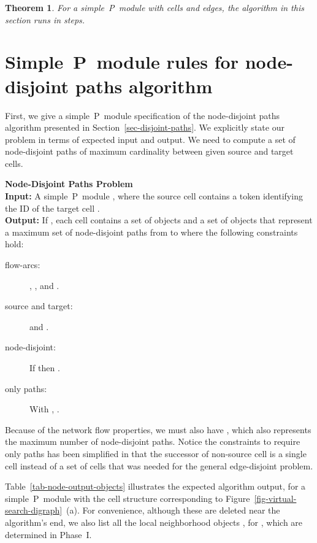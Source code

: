 \documentclass[preliminary,copyright,creativecommons]{eptcs}
\newtheorem{theorem}{Theorem}
\theoremstyle{remark}
\begin{document}
\begin{theorem}
For a simple~P~module with  cells and  edges,
the algorithm in this section runs in  steps.
\end{theorem}


\section{Simple~P~module rules for node-disjoint paths algorithm}
\label{sec-node-disjoint-path-algorithm-rules}

First, we give a simple~P~module specification of the 
node-disjoint paths algorithm presented in Section~\ref{sec-disjoint-paths}.  
We explicitly state our problem in terms of expected input and output.
We need to compute a set of node-disjoint paths of maximum cardinality
between given source and target cells. 

\medskip

\noindent \textbf{Node-Disjoint Paths Problem}\\
\noindent \textbf{Input:} A simple~P~module , 
where the source cell  contains a token  identifying
the ID of the target cell .\\
\noindent \textbf{Output:}  If , each cell 
contains a set of objects  and  
a set of objects  that 
represent a maximum set of
node-disjoint paths from  to  where the following constraints hold:\\

\begin{minipage}{5.5in}
\begin{description}
\item[flow-arcs:] 
     , , 
        and 
     .
\item[source and target:] 
      and .
\item[node-disjoint:] 
     If  then . 
\item[only paths:] 
     With , .
\end{description}
\end{minipage}

\medskip

\noindent Because of the network flow properties, we must also have ,
which also represents the maximum number of node-disjoint paths.
Notice the constraints to require only paths has been simplified in that the
successor  of non-source cell  is a single cell instead of a set of 
cells that was needed for the general edge-disjoint problem.

\bigskip

Table~\ref{tab-node-output-objects} illustrates
the expected algorithm output, for a simple~P~module with the cell structure
corresponding to Figure~\ref{fig-virtual-search-digraph}~(a).
For convenience, although these are deleted near the algorithm's end,
we also list all the local neighborhood objects 
, for , 
which are determined in Phase~I.
\end{document}
